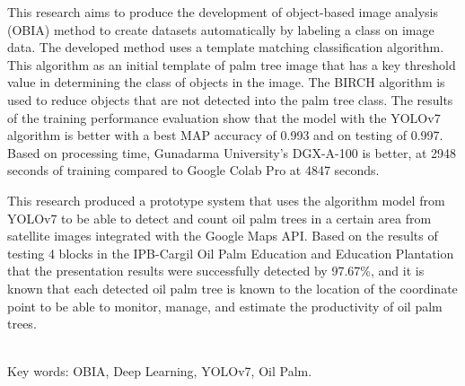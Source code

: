 \begin{singlespace}
This research aims to produce the development of object-based image analysis (OBIA) method to create datasets automatically by labeling a class on image data. The developed method uses a template matching classification algorithm. This algorithm as an initial template of palm tree image that has a key threshold value in determining the class of objects in the image. The BIRCH algorithm is used to reduce objects that are not detected into the palm tree class. The results of the training performance evaluation show that the model with the YOLOv7 algorithm is better with a best MAP accuracy of 0.993 and on testing of 0.997. Based on processing time, Gunadarma University's DGX-A-100 is better, at 2948 seconds of training compared to Google Colab Pro at 4847 seconds.

This research produced a prototype system that uses the algorithm model from YOLOv7 to be able to detect and count oil palm trees in a certain area from satellite images integrated with the Google Maps API. Based on the results of testing 4 blocks in the IPB-Cargil Oil Palm Education and Education Plantation that the presentation results were successfully detected by 97.67\%, and it is known that each detected oil palm tree is known to the location of the coordinate point to be able to monitor, manage, and estimate the productivity of oil palm trees.
\end{singlespace}

\noindent \\

\noindent Key words: OBIA, Deep Learning, YOLOv7, Oil Palm.